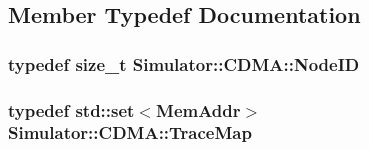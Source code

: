 \subsection{Member Typedef Documentation}
\hypertarget{class_simulator_1_1_c_d_m_a_a59272166fd32e642f3113c22cc756927}{
\subsubsection[{Node\+I\+D}]{\setlength{\rightskip}{0pt plus 5cm}typedef size\+\_\+t {\bf Simulator\+::\+C\+D\+M\+A\+::\+Node\+I\+D}\hspace{0.3cm}{\ttfamily [protected]}}}\label{class_simulator_1_1_c_d_m_a_a59272166fd32e642f3113c22cc756927}
\hypertarget{class_simulator_1_1_c_d_m_a_ace88d950567607d699d7ad9e9cbbb3ef}{
\subsubsection[{Trace\+Map}]{\setlength{\rightskip}{0pt plus 5cm}typedef std\+::set$<$Mem\+Addr$>$ {\bf Simulator\+::\+C\+D\+M\+A\+::\+Trace\+Map}\hspace{0.3cm}{\ttfamily [protected]}}}\label{class_simulator_1_1_c_d_m_a_ace88d950567607d699d7ad9e9cbbb3ef}


